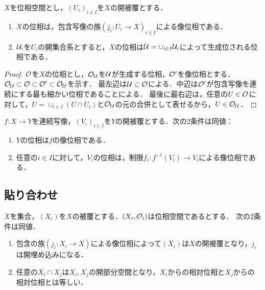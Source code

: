 \documentclass[uplatex,dvipdfmx]{jsreport}
\begin{document}
\begin{proposition}[開被覆の像位相としての見方]
    $X$を位相空間とし，$(U_i)_{i\in I}$を$X$の開被覆とする．
    \begin{enumerate}
        \item $X$の位相は，包含写像の族$(j_i:U_i\to X)_{i\in I}$による像位相である．
        \item $\mathcal{U}_i$を$U_i$の開集合系とすると，$X$の位相は$\mathcal{U}=\cup_{i\in I}\mathcal{U}_i$によって生成位される位相である．
    \end{enumerate}
\end{proposition}
\begin{proof}
    $\mathcal{O}$を$X$の位相とし，$\mathcal{O}_{\mathcal{U}}$を$\mathcal{U}$が生成する位相，$\mathcal{O}'$を像位相とする．
    $\mathcal{O}_{\mathcal{U}}\subset\mathcal{O}\subset\mathcal{O}'\subset\mathcal{O}_{\mathcal{U}}$を示す．
    最左辺は$\mathcal{U}\subset\mathcal{O}$による．中辺は$\mathcal{O}'$が包含写像を連続にする最も細かい位相であることによる．
    最後に最右辺は，任意の$U\in\mathcal{O}$に対して，$U=\cup_{i\in I}(U\cap U_i)$と$\mathcal{O}_{\mathcal{U}}$の元の合併として表せるから，$U\in\mathcal{O}_{\mathcal{U}}$．
\end{proof}


\begin{proposition}
    $f:X\to Y$を連続写像，$(V_i)_{i\in I}$を$Y$の開被覆とする．次の2条件は同値：
    \begin{enumerate}
        \item $Y$の位相は$f$の像位相である．
        \item 任意の$i\in I$に対して，$V_i$の位相は，制限$f_i:f^{-1}(V_i)\to V_i$による像位相である．
    \end{enumerate}
\end{proposition}

\subsection{貼り合わせ}

\begin{theorem}[位相の族の貼り合わせの条件]
    $X$を集合，$(X_i)$を$X$の被覆とする．$(X_i,\mathcal{O}_i)$は位相空間であるとする．
    次の2条件は同値．
    \begin{enumerate}
        \item 包含の族$(j_i:X_i\to X)$による像位相によって$(X_i)$は$X$の開被覆となり，$j_i$は開埋め込みになる．
        \item 任意の$X_i\cap X_j$は$X_i,X_j$の開部分空間となり，$X_i$からの相対位相と$X_j$からの相対位相とは等しい．
    \end{enumerate}
\end{theorem}
\end{document}
